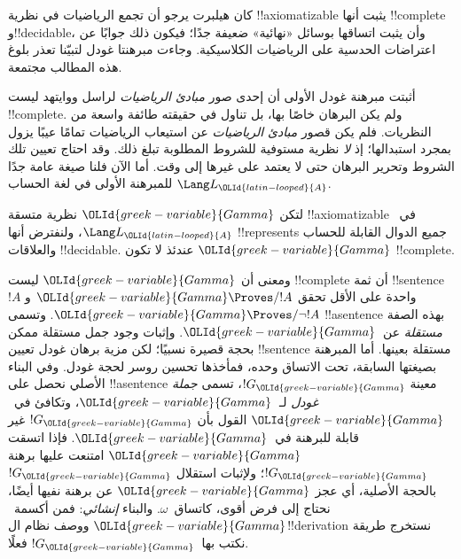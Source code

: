 \documentclass[../../../include/open-logic-section]{subfiles}
\begin{document}


كان هيلبرت يرجو أن تجمع الرياضيات في نظرية
!!{axiomatizable} يثبت أنها !!{complete} و!!{decidable}،
وأن يثبت اتساقها بوسائل «نهائية» ضعيفة جدًا؛ فيكون
ذلك جوابًا عن اعتراضات الحدسية على الرياضيات
الكلاسيكية. وجاءت مبرهنتا غودل لتبيّنا تعذر بلوغ
هذه المطالب مجتمعة.

أثبتت مبرهنة غودل الأولى أن إحدى صور
\emph{مبادئ الرياضيات} لراسل ووايتهد ليست
!!{complete}. ولم يكن البرهان خاصًا بها، بل
تناول في حقيقته طائفة واسعة من النظريات.
فلم يكن قصور \emph{مبادئ الرياضيات} عن استيعاب
الرياضيات تمامًا عيبًا يزول بمجرد استبدالها؛
إذ \emph{لا} نظرية مستوفية للشروط المطلوبة
تبلغ ذلك. وقد احتاج تعيين تلك الشروط وتحرير
البرهان حتى لا يعتمد على غيرها إلى وقت.
أما الآن فلنا صيغة عامة جدًا للمبرهنة الأولى
في لغة الحساب $\Lang L_{\OLId{latin-looped}{A}}$.

\begin{thm}
لتكن ${\OLId{greek-variable}{Gamma}}$ نظرية متسقة !!{axiomatizable}
في~$\Lang L_{\OLId{latin-looped}{A}}$، ولنفترض أنها !!{represents} جميع الدوال
القابلة للحساب والعلاقات !!{decidable}.
عندئذ لا تكون ${\OLId{greek-variable}{Gamma}}$ !!{complete}.
\end{thm}

ومعنى أن ${\OLId{greek-variable}{Gamma}}$ ليست !!{complete} أن ثمة
!!{sentence}~$!A$ واحدة على الأقل تحقق
${\OLId{greek-variable}{Gamma}}\Proves/ !A$ و${\OLId{greek-variable}{Gamma}}\Proves/\lnot !A$.
وتسمى !!a{sentence} بهذه الصفة \emph{مستقلة}
عن~${\OLId{greek-variable}{Gamma}}$. وإثبات وجود جمل مستقلة ممكن
بحجة قصيرة نسبيًا؛ لكن مزية برهان غودل
تعيين !!{sentence} مستقلة بعينها. أما
المبرهنة بصيغتها السابقة، تحت الاتساق وحده،
فمأخذها تحسين روسر لحجة غودل. وفي البناء
الأصلي نحصل على !!a{sentence} معينة
$!G_{\OLId{greek-variable}{Gamma}}$، تسمى \emph{جملة غودل}
لـ~${\OLId{greek-variable}{Gamma}}$، وتكافئ في~${\OLId{greek-variable}{Gamma}}$ القول
بأن $!G_{\OLId{greek-variable}{Gamma}}$ غير قابلة للبرهنة في~${\OLId{greek-variable}{Gamma}}$.
فإذا اتسقت ${\OLId{greek-variable}{Gamma}}$ امتنعت عليها برهنة
$!G_{\OLId{greek-variable}{Gamma}}$؛ ولإثبات استقلال $!G_{\OLId{greek-variable}{Gamma}}$
بالحجة الأصلية، أي عجز ${\OLId{greek-variable}{Gamma}}$ عن برهنة
نفيها أيضًا، نحتاج إلى فرض أقوى، كاتساق~$\omega$.
والبناء \emph{إنشائي}: فمن أكسمة~${\OLId{greek-variable}{Gamma}}$
ووصف نظام ال!!{derivation} نستخرج طريقة
نكتب بها~$!G_{\OLId{greek-variable}{Gamma}}$ فعلًا.
\end{document}
